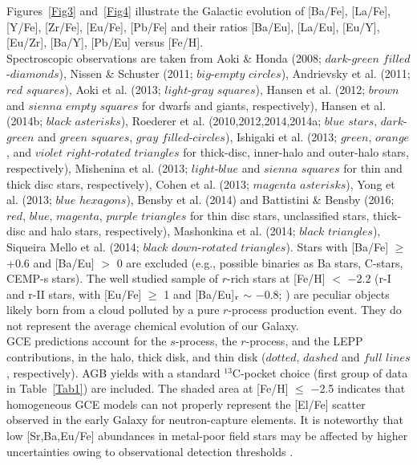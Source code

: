 \documentclass[manuscript]{aastex}
\begin{document}
Figures~\ref{Fig3} and~\ref{Fig4} illustrate the 
Galactic evolution of [Ba/Fe], [La/Fe], [Y/Fe], [Zr/Fe], [Eu/Fe], 
[Pb/Fe] and their ratios [Ba/Eu], [La/Eu], [Eu/Y], [Eu/Zr], [Ba/Y],
[Pb/Eu] versus [Fe/H].
\\
Spectroscopic observations are taken from
Aoki \& Honda (2008; $dark$-$green$ $filled$-$diamonds$),
Nissen \& Schuster (2011; $big$-$empty$ $circles$),
Andrievsky et al. (2011; $red$ $squares$),
Aoki et al. (2013; $light$-$gray$ $squares$), 
Hansen et al. (2012; $brown$ and $sienna$ $empty$ $squares$ for dwarfs and giants, respectively), 
Hansen et al. (2014b; $black$ $asterisks$),
Roederer et al. (2010,2012,2014,2014a; $blue$ $stars$, $dark$-$green$ and $green$ $squares$, $gray$ $filled$-$circles$), 
Ishigaki et al. (2013; $green$, $orange$, and $violet$ $right$-$rotated$ $triangles$ for 
thick-disc, inner-halo and outer-halo stars, respectively), 
Mishenina et al. (2013; $light$-$blue$ and $sienna$ $squares$ for thin and thick disc stars, respectively), 
Cohen et al. (2013; $magenta$ $asterisks$), 
Yong et al. (2013; $blue$ $hexagons$), %
Bensby et al. (2014) and Battistini \& Bensby (2016; $red$, $blue$, $magenta$, $purple$ $triangles$ for 
thin disc stars, unclassified stars, thick-disc and halo stars, respectively), 
Mashonkina et al. (2014; $black$ $triangles$), 
Siqueira Mello et al. (2014; $black$ $down$-$rotated$ $triangles$).
Stars with [Ba/Fe] $\geq$ +0.6 and [Ba/Eu] $>$ 0 are excluded
(e.g., possible binaries as Ba stars, C-stars, CEMP-s stars).
The well studied sample of $r$-rich stars at [Fe/H] $<$ $-$2.2 (r-I and 
r-II stars, with [Eu/Fe] $\geq$ 1 and [Ba/Eu]$_{\rm r}$ $\sim$ $-$0.8;  
\citealt{mashonkina14,roederer14,siq14})
are peculiar objects likely born from a cloud polluted by a pure $r$-process
production event. 
They do not represent the average chemical evolution of our Galaxy. 
\\
GCE predictions account for the $s$-process, the $r$-process, and the 
LEPP contributions, in the halo, thick disk, and thin disk ($dotted$, 
$dashed$ and $full$ $lines$, respectively). AGB yields with a standard
$^{13}$C-pocket choice (first group of data in Table~\ref{Tab1}) are 
included.
The shaded area at [Fe/H] $\leq$ $-$2.5 indicates that homogeneous GCE models can not
properly represent the [El/Fe] scatter observed in the early Galaxy for neutron-capture
elements. 
It is noteworthy that low [Sr,Ba,Eu/Fe] abundances in metal-poor field stars  
may be affected by higher uncertainties owing to observational detection thresholds 
 \citep{roederer13,roederer14a}.
\end{document}

